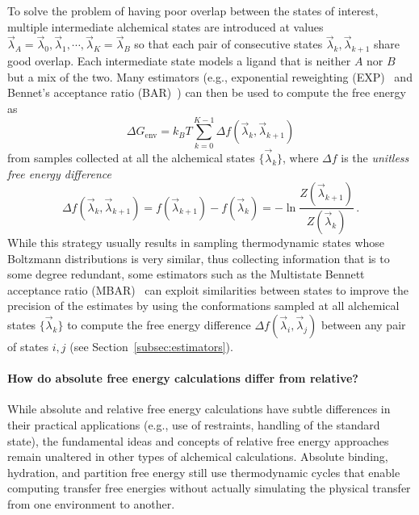 \documentclass[9pt,bestpractices]{livecoms}
\begin{document}
To solve the problem of having poor overlap between the states of interest, multiple intermediate alchemical states are introduced at values $\vec{\lambda}_A = \vec{\lambda}_0, \vec{\lambda}_1, \cdots, \vec{\lambda}_K = \vec{\lambda}_B$ so that each pair of consecutive states $\vec{\lambda}_k, \vec{\lambda}_{k+1}$ share good overlap.
Each intermediate state models a ligand that is neither $A$ nor $B$ but a mix of the two.
Many estimators (e.g., exponential reweighting (EXP)~\cite{zwanzig1954hightemperature} and Bennet's acceptance ratio (BAR)~\cite{bennett1976efficient,shirts2003equilibriuma}) can then be used to compute the free energy as
\begin{equation}
    \Delta G_{\mathrm{env}} = k_BT \sum_{k=0}^{K-1} \Delta f(\vec{\lambda}_k, \vec{\lambda}_{k+1})
\end{equation}
from samples collected at all the alchemical states $\{\vec{\lambda}_k \}$, where $\Delta f$ is the \emph{unitless free energy difference}
\begin{equation}
    \Delta f(\vec{\lambda}_k, \vec{\lambda}_{k+1}) = f(\vec{\lambda}_{k+1}) - f(\vec{\lambda}_k) = - \ln \frac{Z(\vec{\lambda}_{k+1})}{Z(\vec{\lambda}_k)} \, .
\end{equation}
While this strategy usually results in sampling thermodynamic states whose Boltzmann distributions is very similar, thus collecting information that is to some degree redundant, some estimators such as the Multistate Bennett acceptance ratio (MBAR)~\cite{shirts2008statisticallya} can exploit similarities between states to improve the precision of the estimates by using the conformations sampled at all alchemical states $\{\vec{\lambda}_k \}$ to compute the free energy difference $\Delta f(\vec{\lambda}_i, \vec{\lambda}_{j})$ between any pair of states $i,j$  (see Section~\ref{subsec:estimators}).

\paragraph{How do absolute free energy calculations differ from relative?}

While absolute and relative free energy calculations have subtle differences in their practical applications (e.g., use of restraints, handling of the standard state), the fundamental ideas and concepts of relative free energy approaches remain unaltered in other types of alchemical calculations.
Absolute binding, hydration, and partition free energy still use thermodynamic cycles that enable computing transfer free energies without actually simulating the physical transfer from one environment to another.
\end{document}
